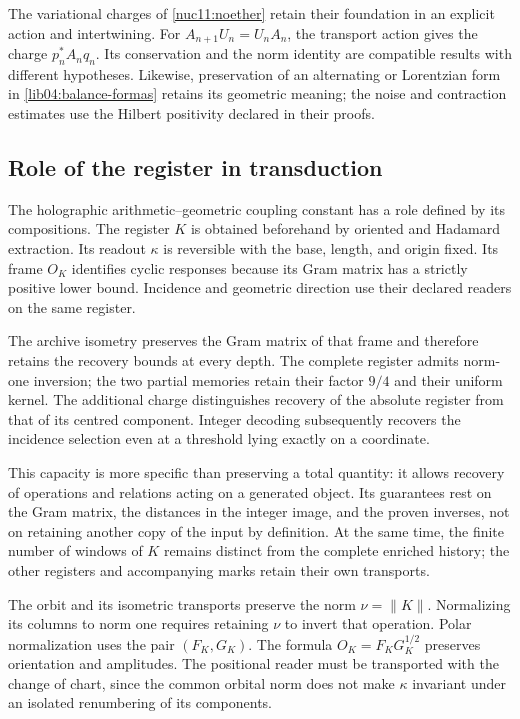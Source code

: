 The variational charges of \cref{nuc11:noether} retain their
foundation in an explicit action and intertwining. For
\(A_{n+1}U_n=U_nA_n\), the transport action gives the charge
\(p_n^*A_nq_n\). Its conservation and the norm identity are
compatible results with different hypotheses. Likewise,
preservation of an alternating or Lorentzian form in
\eqref{lib04:balance-formas} retains its geometric meaning;
the noise and contraction estimates use the Hilbert
positivity declared in their proofs.

\subsection{Role of the register in transduction}
\label{lib06:registro}

The holographic arithmetic--geometric coupling constant has
a role defined by its compositions. The register \(K\)
is obtained beforehand by oriented and Hadamard extraction.
Its readout \(\kappa\) is reversible with the base, length, and origin
fixed. Its frame \(O_K\) identifies cyclic responses because
its Gram matrix has a strictly positive lower bound. Incidence
and geometric direction use their declared readers
on the same register.

The archive isometry preserves the Gram matrix of that frame and therefore
retains the recovery bounds at every depth. The
complete register admits norm-one inversion; the two partial
memories retain their factor \(9/4\) and their uniform kernel. The
additional charge distinguishes recovery of the absolute register from
that of its centred component. Integer decoding subsequently recovers
the incidence selection even at a threshold lying
exactly on a coordinate.

This capacity is more specific than preserving a total quantity:
it allows recovery of operations and relations acting on a
generated object. Its guarantees rest on the Gram matrix, the
distances in the integer image, and the proven inverses, not
on retaining another copy of the input by definition. At the same time,
the finite number of windows of \(K\) remains distinct from the
complete enriched history; the other registers and accompanying
marks retain their own transports.

The orbit and its isometric transports preserve the norm
\(\nu=\|K\|\). Normalizing its columns to norm one requires
retaining \(\nu\) to invert that operation. Polar normalization
uses the pair
\((F_K,G_K)\). The formula
\(O_K=F_KG_K^{1/2}\) preserves orientation and amplitudes.
The positional reader must be transported with the change of chart, since
the common orbital norm does not make \(\kappa\) invariant under an
isolated renumbering of its components.

